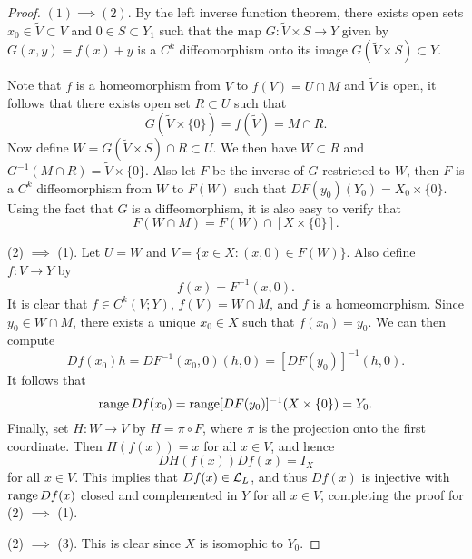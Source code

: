 \documentclass[a4paper]{article}
\begin{document}
\begin{proof}
$(1) \implies (2)$. By the left inverse function theorem,
there exists open sets
$x_0 \in \tilde{V} \subset V$ and $0 \in S \subset Y_1$ 
such that the map $G : \tilde{V} \times S \to Y$ given by 
$G(x, y) = f(x) + y$ is a $C^k$ diffeomorphism onto its image 
$G(\tilde{V} \times S) \subset Y$. 

Note that $f$ is a homeomorphism from $V$ to $f(V) = U \cap M$
and $\tilde{V}$ is open, it follows that there exists 
open set $R \subset U$ such that 
\[
G(\tilde{V} \times \{0\}) = f(\tilde{V}) = M \cap R.
\]
Now define $W = G(\tilde{V} \times S) \cap R \subset U$. 
We then have $W \subset R$ and $G^{-1} (M \cap R) 
= \tilde{V} \times \{0\}$. Also let $F$ be the inverse of 
$G$ restricted to $W$, then $F$ is a $C^k$ diffeomorphism 
from $W$ to $F(W)$ such that $DF(y_0)(Y_0) = X_0 \times \{0\}$.
Using the fact that $G$ is a diffeomorphism, 
it is also easy to verify that
\[
F(W \cap M) = F(W) \cap [X \times \{0\}].
\]

(2) $\implies$ (1). Let $U = W$ and $V = \{x \in X: (x, 0) 
\in F(W)\}$. Also define $f : V \to Y$ by 
\[
f(x) = F^{-1} (x, 0).
\]
It is clear that $f \in C^k(V; Y)$, $f(V) = W \cap M$, 
and $f$ is a homeomorphism.
Since $y_0 \in W \cap M$, there exists a unique $x_0 \in X$ 
such that $f(x_0) = y_0$. We can then compute 
\[
Df(x_0) h = DF^{-1} (x_0, 0) (h, 0) = [DF(y_0)]^{-1} (h, 0).
\]
It follows that 
\[
\operatorname{range} Df(x_0) = \operatorname{range} [DF(y_0)]^{-1} (X \times \{0\}) = Y_0.
\]
Finally, set $H : W \to V$ by $H = \pi \circ F$, where 
$\pi$ is the projection onto the first coordinate. Then 
$H(f(x)) = x$ for all $x \in V$, and hence 
\[
DH(f(x)) Df(x) = I_X
\]
for all $x \in V$. This implies that $Df(x) \in \mathcal{L}_L$, and 
thus $Df(x)$ is injective with $\operatorname{range} Df(x)$ closed and
complemented in $Y$ for all $x \in V$, completing the proof 
for (2) $\implies$ (1).

(2) $\implies$ (3). This is clear since $X$ is isomophic 
to $Y_0$.
\end{proof}
\end{document}
